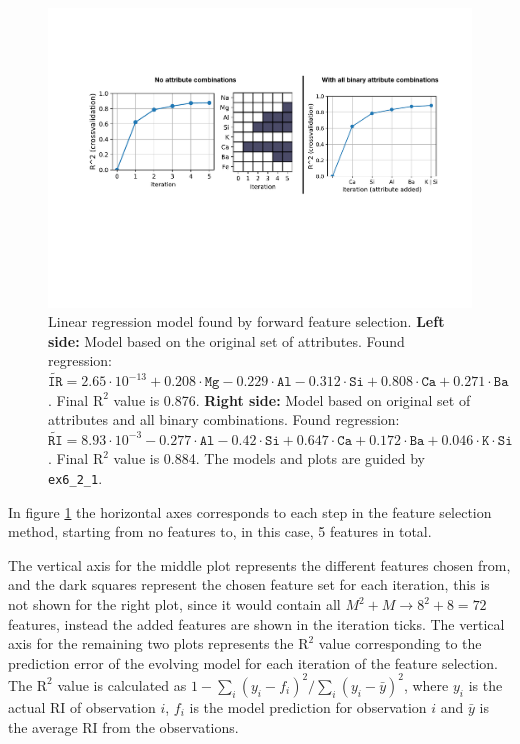 \begin{figure}[H]
    \centering
    \includegraphics[width=\textwidth]{fig/RegressionPlot.pdf}
    \caption{Linear regression model found by forward feature selection. \textbf{Left side:} Model based on the original set of attributes. Found regression: $\widetilde{\texttt{IR}} = 2.65\cdot 10^{-13} + 0.208 \cdot \texttt{Mg} - 0.229 \cdot \texttt{Al} - 0.312 \cdot \texttt{Si} + 0.808 \cdot \texttt{Ca} + 0.271 \cdot \texttt{Ba}$. Final $\text{R}^2$ value is 0.876. 
    \textbf{Right side:} Model based on original set of attributes and all binary combinations. Found regression: $\widetilde{\texttt{RI}} = 8.93\cdot 10^{-3} - 0.277 \cdot \texttt{Al} - 0.42 \cdot \texttt{Si} + 0.647 \cdot \texttt{Ca} + 0.172 \cdot \texttt{Ba} + 0.046 \cdot \texttt{K}\cdot\texttt{Si}$. Final $\text{R}^2$ value is 0.884.
    The models and plots are guided by \texttt{ex6\_2\_1}.}
    \label{fig:linreg_fs}
\end{figure}

In figure \ref{fig:linreg_fs} the horizontal axes corresponds to each step in the feature selection method, starting from no features to, in this case, 5 features in total. 

The vertical axis for the middle plot represents the different features chosen from, and the dark squares represent the chosen feature set for each iteration, this is not shown for the right plot, since it would contain all $M^2+M \rightarrow 8^2+8 = 72$ features, instead the added features are shown in the iteration ticks. The vertical axis for the remaining two plots represents the $\text{R}^2$ value corresponding to the prediction error of the evolving model for each iteration of the feature selection. The $\text{R}^2$ value is calculated as $1 - \sum_{i} \left(y_i - f_i\right)^2/\sum_{i} \left(y_i - \bar{y}\right)^2$, where $y_i$ is the actual RI of observation $i$, $f_i$ is the model prediction for observation $i$ and $\bar{y}$ is the average RI from the observations. 

